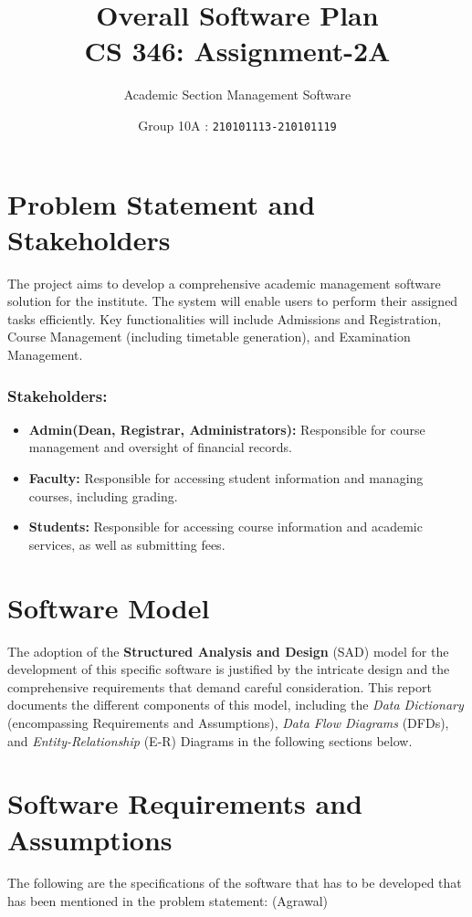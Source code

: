 \documentclass[12pt,a4paper]{article}
\begin{document}
\title{\huge \textbf{Overall Software Plan} \\ \LARGE {\textbf{CS 346: Assignment-2A}}}
\author{\Large Academic Section Management Software}
\date{Group 10A : \texttt{210101113-210101119}}
\maketitle


\section{Problem Statement and Stakeholders}
The project aims to develop a comprehensive academic management software solution for the institute. The system will enable users to perform their assigned tasks efficiently. Key functionalities will include Admissions and Registration, Course Management (including timetable generation), and Examination Management.

\subsubsection*{Stakeholders:}
\begin{itemize}
    \item \textbf{Admin(Dean, Registrar, Administrators):} Responsible for course management and oversight of financial records.
    \item \textbf{Faculty:} Responsible for accessing student information and managing courses, including grading.
    \item \textbf{Students:} Responsible for accessing course information and academic services, as well as submitting fees.
\end{itemize}

\section{Software Model}
The adoption of the \textbf{Structured Analysis and Design} (SAD) model for the development of this specific software is justified by the intricate design and the comprehensive requirements that demand careful consideration. This report documents the different components of this model, including the \textit{Data Dictionary} (encompassing Requirements and Assumptions), \textit{Data Flow Diagrams} (DFDs), and \textit{Entity-Relationship} (E-R) Diagrams in the following sections below.
    
\section{Software Requirements and Assumptions}
The following are the specifications of the software that has to be developed that has been mentioned in the problem statement: (Agrawal)
\end{document}
